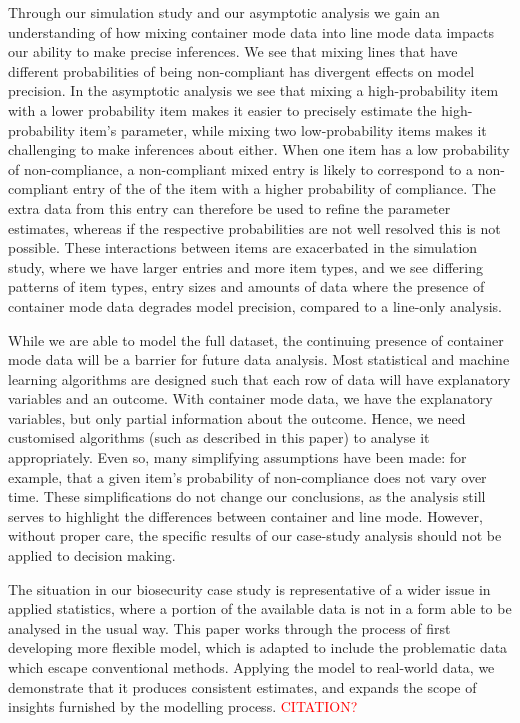 \documentclass[aoas]{imsart}
\begin{document}
Through our simulation study and our asymptotic analysis we gain an understanding of how mixing container mode data into line mode data impacts our ability to make precise inferences. We see that mixing lines that have different probabilities of being non-compliant has divergent effects on model precision. In the asymptotic analysis we see that mixing a high-probability item with a lower probability item makes it easier to precisely estimate the high-probability item's parameter, while mixing two low-probability items makes it challenging to make inferences about either. {When one item has a low probability of non-compliance, a non-compliant mixed entry is likely to correspond to a non-compliant entry of the of the item with a higher probability of compliance.  The extra data from this entry can therefore be used to refine the parameter estimates, whereas if the respective probabilities are not well resolved this is not possible.} These interactions between items are exacerbated in the simulation study, where we have larger entries and more item types, and we see differing patterns of item types, entry sizes and amounts of data where the presence of container mode data degrades model precision, compared to a line-only analysis. 

While we are able to model the full dataset, the continuing presence of container mode data will be a barrier for future data analysis. Most statistical and machine learning algorithms are designed such that each row of data will have explanatory variables and an outcome. With container mode data, we have the explanatory variables, but only partial information about the outcome. Hence, we need customised algorithms (such as described in this paper) to analyse it appropriately.  {Even so, many simplifying assumptions have been made: for example, that a given item's probability of non-compliance does not vary over time. These simplifications do not change our conclusions, as the analysis still serves to highlight the differences between container and line mode. However, without proper care, the specific results of our case-study analysis should not be applied to decision making.} %

The situation in our biosecurity case study is representative of a wider issue in applied statistics, where a portion of the available data is not in a form able to be analysed in the usual way. This paper works through the process of first developing more flexible model, which is adapted to include the problematic data which escape conventional methods. Applying the model to real-world data, we demonstrate that it produces consistent estimates, and expands the scope of insights furnished by the modelling process. \textcolor{red}{CITATION?}
\end{document}

